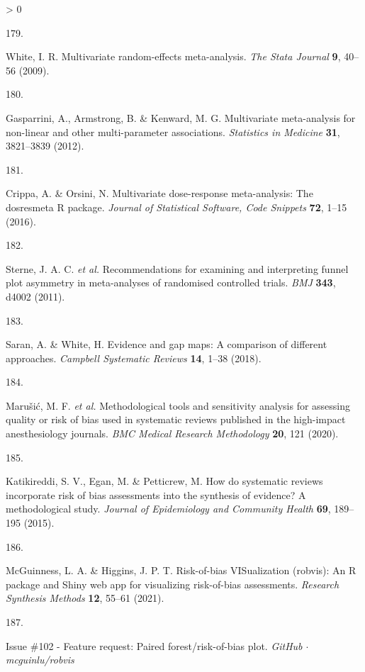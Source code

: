\documentclass[a4paper, twoside]{templates/ociamthesis}
\newlength{\cslhangindent}
\newlength{\csllabelwidth}
\newenvironment{CSLReferences}[3] %
 {%
  \setlength{\parindent}{0pt}
  \ifodd #1 \everypar{\setlength{\hangindent}{\cslhangindent}}\ignorespaces\fi
  \ifnum #2 > 0
  \setlength{\parskip}{#2\baselineskip}
  \fi
 }%
 {}
\newcommand{\CSLLeftMargin}[1]{\parbox[t]{\maxof{\widthof{#1}}{\csllabelwidth}}{#1}}
\newcommand{\CSLRightInline}[1]{\parbox[t]{\linewidth - \csllabelwidth}{#1}}
\begin{document}
\begin{CSLReferences}{0}{0}
\leavevmode\hypertarget{ref-white2009}{}%
\CSLLeftMargin{179. }
\CSLRightInline{White, I. R. Multivariate random-effects meta-analysis. \emph{The Stata Journal} \textbf{9}, 40--56 (2009).}

\leavevmode\hypertarget{ref-gasparrini2012}{}%
\CSLLeftMargin{180. }
\CSLRightInline{Gasparrini, A., Armstrong, B. \& Kenward, M. G. Multivariate meta-analysis for non-linear and other multi-parameter associations. \emph{Statistics in Medicine} \textbf{31}, 3821--3839 (2012).}

\leavevmode\hypertarget{ref-crippa2016}{}%
\CSLLeftMargin{181. }
\CSLRightInline{Crippa, A. \& Orsini, N. Multivariate dose-response meta-analysis: The dosresmeta {R} package. \emph{Journal of Statistical Software, Code Snippets} \textbf{72}, 1--15 (2016).}

\leavevmode\hypertarget{ref-sterne2011}{}%
\CSLLeftMargin{182. }
\CSLRightInline{Sterne, J. A. C. \emph{et al.} Recommendations for examining and interpreting funnel plot asymmetry in meta-analyses of randomised controlled trials. \emph{BMJ} \textbf{343}, d4002 (2011).}

\leavevmode\hypertarget{ref-saran2018}{}%
\CSLLeftMargin{183. }
\CSLRightInline{Saran, A. \& White, H. Evidence and gap maps: A comparison of different approaches. \emph{Campbell Systematic Reviews} \textbf{14}, 1--38 (2018).}

\leavevmode\hypertarget{ref-marusic2020}{}%
\CSLLeftMargin{184. }
\CSLRightInline{Marušić, M. F. \emph{et al.} Methodological tools and sensitivity analysis for assessing quality or risk of bias used in systematic reviews published in the high-impact anesthesiology journals. \emph{BMC Medical Research Methodology} \textbf{20}, 121 (2020).}

\leavevmode\hypertarget{ref-katikireddi2015}{}%
\CSLLeftMargin{185. }
\CSLRightInline{Katikireddi, S. V., Egan, M. \& Petticrew, M. How do systematic reviews incorporate risk of bias assessments into the synthesis of evidence? A methodological study. \emph{Journal of Epidemiology and Community Health} \textbf{69}, 189--195 (2015).}

\leavevmode\hypertarget{ref-mcguinness2020robvisPaper}{}%
\CSLLeftMargin{186. }
\CSLRightInline{McGuinness, L. A. \& Higgins, J. P. T. Risk-of-bias {VISualization} (robvis): An {R} package and {Shiny} web app for visualizing risk-of-bias assessments. \emph{Research Synthesis Methods} \textbf{12}, 55--61 (2021).}

\leavevmode\hypertarget{ref-zotero-14999}{}%
\CSLLeftMargin{187. }
\CSLRightInline{Issue \#102 - {Feature} request: Paired forest/risk-of-bias plot. \emph{GitHub {\(\cdot\)} mcguinlu/robvis}}


\end{CSLReferences}
\end{document}
